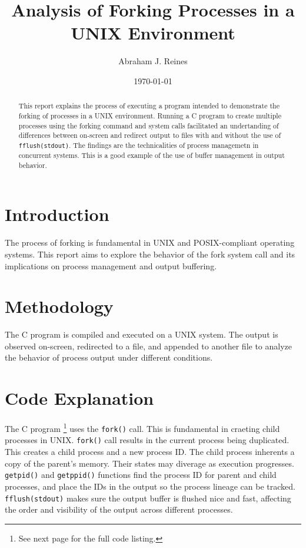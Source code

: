 \documentclass[12pt]{article}
\begin{document}
\title{Analysis of Forking Processes in a UNIX Environment}
\author{Abraham J. Reines}
\date{\today}

\maketitle

\begin{abstract}
This report explains the process of executing a program intended to demonstrate the forking of processes in a UNIX environment. Running a C program to create multiple processes using the forking command and system calls facilitated an undertanding of differences between on-screen and redirect output to files with and without the use of \texttt{fflush(stdout)}. The findings are the technicalities of process managemetn in concurrent systems. This is a good example of the use of buffer management in output behavior. 
\end{abstract}

\section{Introduction}
The process of forking is fundamental in UNIX and POSIX-compliant operating systems. This report aims to explore the behavior of the fork system call and its implications on process management and output buffering.

\section{Methodology}
The C program is compiled and executed on a UNIX system. The output is observed on-screen, redirected to a file, and appended to another file to analyze the behavior of process output under different conditions.

\section{Code Explanation}
The C program \footnote{See next page for the full code listing.} uses the \texttt{fork()} call. This is fundamental in craeting child processes in UNIX. \texttt{fork()} call results in the current process being duplicated. This creates a child process and a new process ID. The child process inherents a copy of the parent's memory. Their states may diverage as execution progresses. \texttt{getpid()} and \texttt{getppid()} functions find the process ID for parent and child processes, and place the IDs in the output so the process lineage can be tracked. \texttt{fflush(stdout)} makes sure the output buffer is flushed nice and fast, affecting the order and visibility of the output across different processes.
\end{document}
